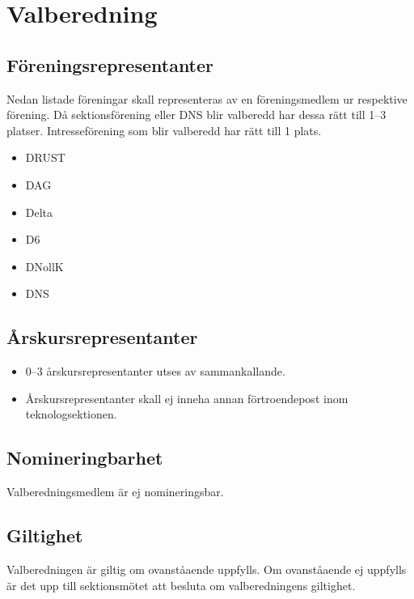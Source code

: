 \section{Valberedning}
\subsection{Föreningsrepresentanter}
Nedan listade föreningar skall representeras av en föreningsmedlem ur respektive förening. Då sektionsförening eller DNS blir valberedd har dessa rätt till 1--3 platser. Intresseförening som blir valberedd har rätt till 1 plats. 
\begin{itemize}
  \item DRUST 
  \item DAG 
  \item Delta 
  \item D6 
  \item DNollK
  \item DNS
\end{itemize}
\subsection{Årskursrepresentanter}
\begin{itemize}
  \item 0--3 årskursrepresentanter utses av sammankallande. 
  \item Årskursrepresentanter skall ej inneha annan förtroendepost inom teknologsektionen. 
\end{itemize}
\subsection{Nomineringbarhet}
Valberedningsmedlem är ej nomineringsbar.
\subsection{Giltighet}
Valberedningen är giltig om ovanståaende uppfylls. Om ovanståaende ej uppfylls är det upp till sektionsmötet att besluta om valberedningens giltighet.
